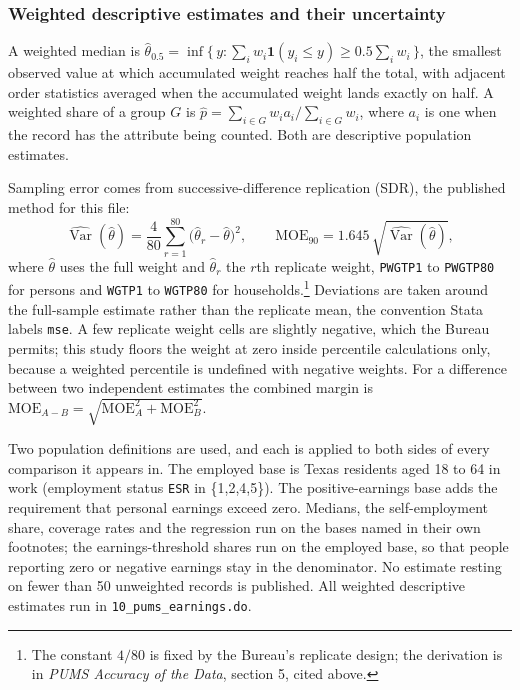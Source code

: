 \subsubsection*{Weighted descriptive estimates and their uncertainty}

A weighted median is
\(\hat\theta_{0.5} = \inf\{\,y : \sum_i w_i \mathbf{1}(y_i \le y)
   \ge 0.5 \sum_i w_i\,\}\),
the smallest observed value at which accumulated weight reaches half the
total, with adjacent order statistics averaged when the accumulated weight
lands exactly on half. A weighted share of a group \(G\) is
\(\hat p = \sum_{i \in G} w_i a_i \big/ \sum_{i \in G} w_i\), where \(a_i\)
is one when the record has the attribute being counted. Both are descriptive
population estimates.

Sampling error comes from successive-difference replication (SDR), the
published method for this file:
\[
\widehat{\operatorname{Var}}(\hat\theta)
  = \frac{4}{80}\sum_{r=1}^{80}\bigl(\hat\theta_r - \hat\theta\bigr)^{2},
\qquad
\mathrm{MOE}_{90} = 1.645\,\sqrt{\widehat{\operatorname{Var}}(\hat\theta)},
\]
where \(\hat\theta\) uses the full weight and \(\hat\theta_r\) the \(r\)th
replicate weight, \texttt{PWGTP1} to \texttt{PWGTP80} for persons and
\texttt{WGTP1} to \texttt{WGTP80} for households.\footnote{The constant
\(4/80\) is fixed by the Bureau's replicate design; the derivation is in
\emph{PUMS Accuracy of the Data}, section 5, cited above.} Deviations are
taken around the full-sample estimate rather than the replicate mean, the
convention Stata labels \texttt{mse}. A few replicate weight cells are
slightly negative, which the Bureau permits; this study floors the weight
at zero inside percentile calculations only, because a weighted percentile
is undefined with negative weights. For a difference between two
independent estimates the combined margin is
\(\mathrm{MOE}_{A-B} = \sqrt{\mathrm{MOE}_A^{2} + \mathrm{MOE}_B^{2}}\).

Two population definitions are used, and each is applied to both sides of
every comparison it appears in. The employed base is Texas residents aged
18 to 64 in work (employment status \texttt{ESR} in \{1,2,4,5\}). The
positive-earnings base adds the requirement that personal earnings exceed
zero. Medians, the self-employment share, coverage rates and the regression
run on the bases named in their own footnotes; the earnings-threshold
shares run on the employed base, so that people reporting zero or negative
earnings stay in the denominator. No estimate resting on fewer than 50
unweighted records is published. All weighted descriptive estimates run in
\texttt{10\_pums\_earnings.do}.

